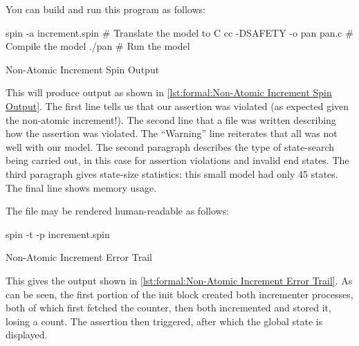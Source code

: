 You can build and run this program as follows:

\begin{VerbatimU}
spin -a increment.spin      # Translate the model to C
cc -DSAFETY -o pan pan.c    # Compile the model
./pan                       # Run the model
\end{VerbatimU}

\begin{listing}
\vspace*{-9pt}
\caption{Non-Atomic Increment Spin Output}
\label{lst:formal:Non-Atomic Increment Spin Output}
\end{listing}

This will produce output as shown in
\cref{lst:formal:Non-Atomic Increment Spin Output}.
The first line tells us that our assertion was violated (as expected
given the non-atomic increment!).
The second line that a  file was written describing how the
assertion was violated.
The ``Warning'' line reiterates that all was not well with our model.
The second paragraph describes the type of state-search being carried out,
in this case for assertion violations and invalid end states.
The third paragraph gives state-size statistics: this small model had only
45 states.
The final line shows memory usage.

The  file may be rendered human-readable as follows:

\begin{VerbatimU}
spin -t -p increment.spin
\end{VerbatimU}

\begin{listing*}
\IfEbookSize{\vspace*{7pt}}{\vspace*{-9pt}}
\caption{Non-Atomic Increment Error Trail}
\label{lst:formal:Non-Atomic Increment Error Trail}
\end{listing*}

This gives the output shown in
\cref{lst:formal:Non-Atomic Increment Error Trail}.
As can be seen, the first portion of the init block created both
incrementer processes, both of which first fetched the counter,
then both incremented and stored it, losing a count.
The assertion then triggered, after which the global state is displayed.


